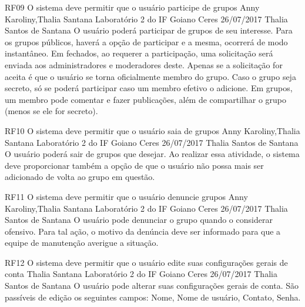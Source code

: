 \documentclass[versao=digital]{ifgoiano_ceres_tc_v2}
\begin{document}
\requisitoFuncional
{RF09}
{O sistema deve permitir que o usuário participe de grupos}
{Anny Karoliny,Thalia Santana}
{Laboratório 2 do IF Goiano Ceres}
{26/07/2017}
{Thalia Santos de Santana}
{O usuário poderá participar de grupos de seu interesse. Para os grupos públicos, haverá a opção de participar e a mesma,  ocorrerá de modo instantâneo. Em fechados, ao requerer a participação, uma solicitação será enviada aos administradores e moderadores deste. Apenas se a solicitação for aceita é que o usuário se torna oficialmente membro do grupo. Caso o grupo seja secreto, só se poderá participar caso um membro efetivo o adicione.  Em grupos, um membro pode comentar e fazer publicações, além de compartilhar o grupo (menos se ele for secreto).
}

\requisitoFuncional
{RF10}
{O sistema deve permitir que o usuário saia de grupos}
{Anny Karoliny,Thalia Santana}
{Laboratório 2 do IF Goiano Ceres}
{26/07/2017}
{Thalia Santos de Santana}
{O usuário poderá sair de grupos que desejar. Ao realizar essa atividade, o sistema deve proporcionar também a opção de que o usuário não possa mais ser adicionado de volta ao grupo em questão.
}

\requisitoFuncional
{RF11}
{O sistema deve permitir que o usuário denuncie grupos}
{Anny Karoliny,Thalia Santana}
{Laboratório 2 do IF Goiano Ceres}
{26/07/2017}
{Thalia Santos de Santana}
{O usuário pode denunciar o grupo quando o considerar ofensivo. Para tal ação, o motivo da denúncia deve ser informado para que a equipe de manutenção averigue a situação.
}

\requisitoFuncional
{RF12}
{O sistema deve permitir que o usuário edite suas configurações gerais de conta}
{Thalia Santana}
{Laboratório 2 do IF Goiano Ceres}
{26/07/2017}
{Thalia Santos de Santana}
{O usuário pode alterar suas configurações gerais de conta. São passíveis de edição os seguintes campos: Nome, Nome de usuário, Contato,  Senha.
}
\end{document}
